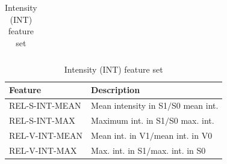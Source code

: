 \documentclass[a4paper]{article}
\begin{document}
\begin{table}[!b]
\begin{subtable}{\columnwidth}
{\begin{tabularx}{\columnwidth}{lX}
		
		\bottomrule
		\end{tabularx}
		} %
		\label{tab:f0features}
		\end{subtable}
		
		\vspace{1em}
		
		\begin{subtable}{\columnwidth}
		\caption{Intensity (INT) feature set}
		\begin{tabularx}{\columnwidth}{Xl}%
		\toprule
		Feature & Description \\
		\midrule
		REL-S-INT-MEAN 
			& Mean intensity in S1$/$S0 mean int.
			\\
			
		REL-S-INT-MAX 
			& Maximum int. in S1$/$S0 max. int.
			\\
			
		REL-V-INT-MEAN 
			& Mean int. in V1$/$mean int. in V0
			\\
			
		REL-V-INT-MAX 
			& Max. int. in S1$/$max. int. in S0
			\\
			
			
		\bottomrule
		\end{tabularx}
		\label{tab:enerfeatures}
		\end{subtable}
	
		\label{tab:prosfeatures}
		\end{table}
	    
\end{document}
